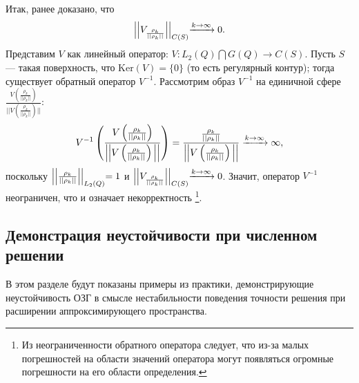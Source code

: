 \documentclass[a4paper]{article}
\begin{document}
Итак, ранее доказано, что $$\Bigl|\Bigl|V_{\frac{\rho_k}{||\rho_k ||}}  \Bigl|\Bigl|_{C(S)}\xrightarrow{k \rightarrow \infty} 0.$$
Представим $V$ как линейный оператор: $V: L_2(Q) \bigcap G(Q) \rightarrow C(S)$. Пусть $S$ --- такая поверхность, что $\text{Ker} (V)=\{0\}$ (то есть регулярный контур);
тогда существует обратный оператор $V^{-1}$.
Рассмотрим образ $V^{-1}$ на единичной сфере $\frac{V\left(\frac{\rho_k}{||\rho_k ||}\right)}{||V\left(\frac{\rho_k}{||\rho_k ||}\right)||}$:
\begin{equation}
  V^{-1}\left(\frac{V\left(\frac{\rho_k}{||\rho_k ||}\right)}{\Bigl|\Bigl|V\left(\frac{\rho_k}{||\rho_k ||}\right)\Bigl|\Bigl|}\right)=\frac{\frac{\rho_k}{||\rho_k ||}}{\Bigl|\Bigl|V\left(\frac{\rho_k}{||\rho_k ||}\right)\Bigl|\Bigl|} \xrightarrow{k\rightarrow \infty} \infty,
\end{equation}
поскольку $\Bigl|\Bigl|\frac{\rho_k}{||\rho_k ||}\Bigl|\Bigl|_{L_2(Q)}=1$ и $\Bigl|\Bigl|V_{\frac{\rho_k}{||\rho_k ||}}  \Bigl|\Bigl|_{C(S)}\xrightarrow{k \rightarrow \infty} 0$.
Значит, оператор $V^{-1}$ неограничен, что и означает некорректность \footnote{Из неограниченности обратного оператора следует, что из-за малых погрешностей на области значений оператора могут появляться огромные погрешности на его области определения.}.

\subsection{Демонстрация неустойчивости при численном решении}
В этом разделе будут показаны примеры из практики, демонстрирующие неустойчивость ОЗГ в смысле нестабильности поведения точности решения при расширении аппроксимирующего пространства.
\end{document}
